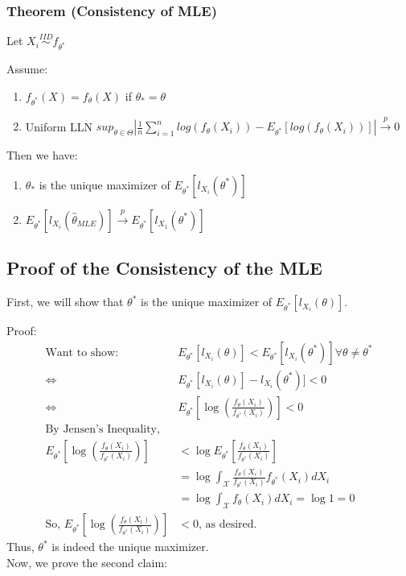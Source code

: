 \documentclass[aos,preprint]{imsart}
\numberwithin{equation}{section}
\theoremstyle{plain}
\begin{document}
\subsubsection{Theorem (Consistency of MLE)}
Let $ X_{i} \overset{IID} \sim f_{\theta^{*}}$

Assume:
\begin{enumerate}
\item $ f_{\theta^{*}}\left (X  \right ) = f_{\theta}\left (X  \right )$ if $ \theta_{*} = \theta $
\item Uniform LLN $ sup_{\theta \in \Theta}\left | \frac{1}{n}\sum_{i=1}^{n}log\left ( f_{\theta}\left ( X_{i} \right)\right) - E_{\theta^{*}}\left [log\left ( f_{\theta}\left ( X_{i} \right) \right )  \right ] \right | \overset{p} \rightarrow 0 $ 
\end{enumerate}

Then we have:
\begin{enumerate}
\item $ \theta_{*} $ is the unique maximizer of $ E_{\theta^{*}}\left [ l_{X_{i}}\left ( \theta^{*} \right ) \right ] $
\item $ E_{\theta^{*}}\left [ l_{X_{i}}\left ( \hat \theta_{MLE} \right ) \right ] \overset{p} \rightarrow E_{\theta^{*}}\left [ l_{X_{1}}\left ( \theta^{*} \right ) \right ] $ 
\end{enumerate}


\subsection{Proof of the Consistency of the MLE}

First, we will show that $\theta^*$ is the unique maximizer of $E_{\theta^*} [l_{X_i} (\theta)]$.

Proof:
\begin{align}
	\text{Want to show: } & E_{\theta^*} [l_{X_i} (\theta)] < E_{\theta^*} [l_{X_i} (\theta^*)] \forall \theta \neq \theta^* \\
	\iff & E_{\theta^*} [l_{X_i} (\theta)] - l_{X_i} (\theta^*)] < 0 \\
	\iff & E_{\theta^*} [\log (\frac{f_\theta (X_i)}{f_{\theta^*} (X_i)})] < 0 \\
	\text{By Jensen's Inequality, } \\
	E_{\theta^*} [\log (\frac{f_\theta (X_i)}{f_{\theta^*} (X_i)})] & < \log E_{\theta^*} [\frac{f_\theta (X_i)}{f_{\theta^*} (X_i)}] \\
	& = \log \int_{\mathcal{X}}^{} \frac{f_\theta (X_i)}{f_{\theta^*} (X_i)} f_{\theta^*} (X_i) dX_i 
	\\ & = \log \int_{\mathcal{X}}^{} f_\theta (X_i) dX_i = \log 1 = 0 \\
	\text{So, } E_{\theta^*} [\log (\frac{f_\theta (X_i)}{f_{\theta^*} (X_i)})] & < 0 \text{, as desired.}
\end{align}
Thus, $\theta^*$ is indeed the unique maximizer.\\
Now, we prove the second claim:
\end{document}
